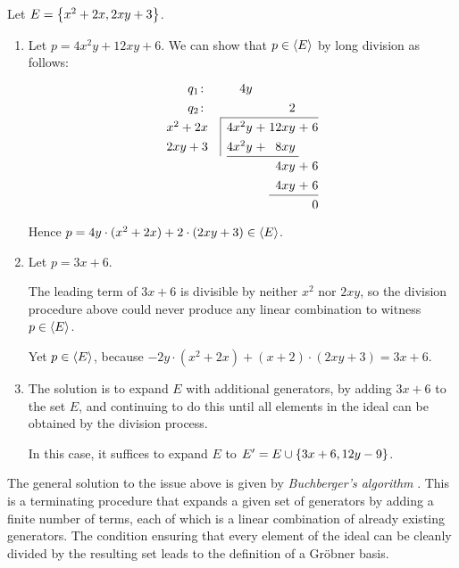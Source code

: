 \documentclass[numbers=enddot]{scrartcl}
\begin{document}
\begin{expl}
  Let $E = \left\{x^2+2x, 2xy+3\right\}$.
  \begin{enumerate}
  \item 
    Let $p = 4x^2y + 12xy + 6$. We can show that $p \in {\left\langle{E}\right\rangle}$ by long division as follows:
\[
\renewcommand{\arraystretch}{1.3}
\begin{array}{@{}r@{\quad}c@{\enspace}r@{\;}c@{\;}r@{\;}c@{\;}r@{}}
 q_1\colon     &  & 4y    &   &      &   &   \\
 q_2\colon     &  &       &   & 2    &   &   \\ \cline{2-7}
 \dvsr{x^2+2x} &  & 4x^2y & + & 12xy & + & 6 \\
 \dvsr{2xy+3}  &  & 4x^2y & + &  8xy &   &   \\ \cline{3-5}
               &  &       &   &  4xy & + & 6 \\
               &  &       &   &  4xy & + & 6 \\ \cline{5-7}
               &  &       &   &      &   & 0
\end{array}
\]
Hence $p = 4y\cdot(x^2+2x) + 2\cdot(2xy+3) \in {\left\langle{E}\right\rangle}$.
  \item
    Let $p = 3x+6$. 

    The leading term of $3x+6$ is divisible by neither $x^2$ nor $2xy$, so the 
    division procedure above could never produce any linear combination to witness $p \in {\left\langle{E}\right\rangle}$.

    Yet $p \in {\left\langle{E}\right\rangle}$, because $-2y\cdot(x^2+2x) + (x+2)\cdot(2xy+3) = 3x+6$.

  \item
    The solution is to expand $E$ with additional generators, by adding $3x+6$ to the set $E$, and 
    continuing to do this until all elements in the ideal can be obtained by the division process.
    
    In this case, it suffices to expand $E$ to $E' = E \cup \left\{3x+6,12y-9\right\}$. 
\end{enumerate}
\end{expl}

The general solution to the issue above is given by \emph{Buchberger's algorithm} \cite[9.6]{DF}.
This is a terminating procedure that expands a given set of generators by adding a finite number of terms,
    each of which is a linear combination of already existing generators. The condition ensuring 
    that every element of the ideal can be cleanly divided by the resulting set 
    leads to the definition of a Gr\"obner basis.
\end{document}
